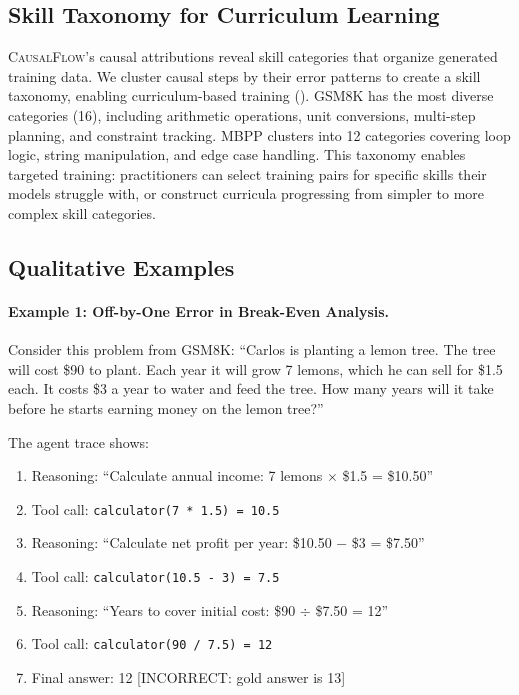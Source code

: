 \documentclass{article}
\theoremstyle{plain}
\theoremstyle{definition}
\theoremstyle{remark}
\begin{document}
\subsection{Skill Taxonomy for Curriculum Learning}

\textsc{CausalFlow}'s causal attributions reveal skill categories that organize generated training data. We cluster causal steps by their error patterns to create a skill taxonomy, enabling curriculum-based training (). GSM8K has the most diverse categories (16), including arithmetic operations, unit conversions, multi-step planning, and constraint tracking. MBPP clusters into 12 categories covering loop logic, string manipulation, and edge case handling. This taxonomy enables targeted training: practitioners can select training pairs for specific skills their models struggle with, or construct curricula progressing from simpler to more complex skill categories.

\subsection{Qualitative Examples}

\paragraph{Example 1: Off-by-One Error in Break-Even Analysis.}
Consider this problem from GSM8K: ``Carlos is planting a lemon tree. The tree will cost \$90 to plant. Each year it will grow 7 lemons, which he can sell for \$1.5 each. It costs \$3 a year to water and feed the tree. How many years will it take before he starts earning money on the lemon tree?''

The agent trace shows:
\begin{enumerate}
    \item Reasoning: ``Calculate annual income: 7 lemons $\times$ \$1.5 = \$10.50''
    \item Tool call: \texttt{calculator(7 * 1.5) = 10.5}
    \item Reasoning: ``Calculate net profit per year: \$10.50 $-$ \$3 = \$7.50''
    \item Tool call: \texttt{calculator(10.5 - 3) = 7.5}
    \item Reasoning: ``Years to cover initial cost: \$90 $\div$ \$7.50 = 12''
    \item Tool call: \texttt{calculator(90 / 7.5) = 12}
    \item Final answer: 12 [INCORRECT: gold answer is 13]
\end{enumerate}
\end{document}
